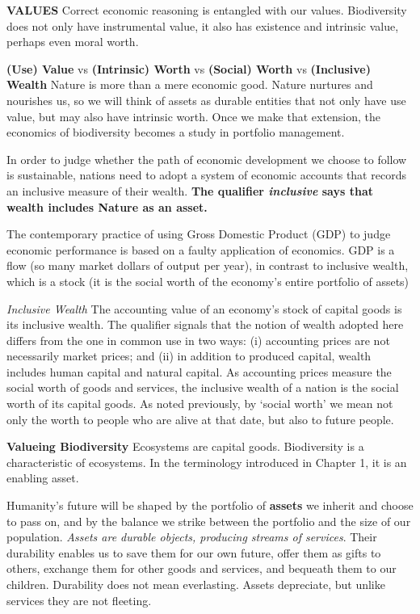 \documentclass[
]{book}
\begin{document}
\textbf{VALUES}
Correct economic reasoning is entangled with our values. Biodiversity does not only have
instrumental value, it also has existence and intrinsic value, perhaps even moral worth.

\textbf{(Use) Value} vs \textbf{(Intrinsic) Worth} vs \textbf{(Social) Worth} vs \textbf{(Inclusive) Wealth}
Nature is more than a mere economic good. Nature nurtures and nourishes us,
so we will think of assets as durable entities that not only have use value, but may also have
intrinsic worth. Once we make that extension, the economics of biodiversity becomes a study in
portfolio management.

In order to judge whether the path of economic development
we choose to follow is sustainable, nations need to adopt a system of economic accounts that
records an inclusive measure of their wealth. \textbf{The qualifier \emph{inclusive} says that wealth includes
Nature as an asset.}

The contemporary practice of using Gross Domestic Product (GDP) to judge
economic performance is based on a faulty application of economics. GDP is a flow (so many
market dollars of output per year), in contrast to inclusive wealth, which is a stock (it is the
social worth of the economy's entire portfolio of assets)

\emph{Inclusive Wealth}
The accounting value of an economy's stock of capital goods is its inclusive wealth. The qualifier
signals that the notion of wealth adopted here differs from the one in common use in two ways:
(i) accounting prices are not necessarily market prices; and (ii) in addition to produced capital,
wealth includes human capital and natural capital. As accounting prices measure the social
worth of goods and services, the inclusive wealth of a nation is the social worth of its capital
goods. As noted previously, by `social worth' we mean not only the worth to people who are
alive at that date, but also to future people.

\textbf{Valueing Biodiversity}
Ecosystems are capital goods. Biodiversity is a characteristic of ecosystems. In the terminology
introduced in Chapter 1, it is an enabling asset.

Humanity's future will be shaped by the portfolio of \textbf{assets} we inherit and choose to pass on,
and by the balance we strike between the portfolio and the size of our population. \emph{Assets are
durable objects, producing streams of services}. Their durability enables us to save them for our
own future, offer them as gifts to others, exchange them for other goods and services, and
bequeath them to our children. Durability does not mean everlasting. Assets depreciate, but
unlike services they are not fleeting.
\end{document}
